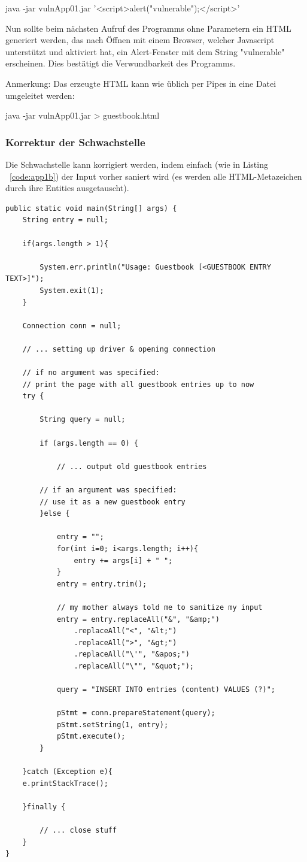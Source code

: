 \documentclass[12pt,a4paper,titlepage,oneside]{scrartcl}
\begin{document}
java -jar vulnApp01.jar '<script>alert("vulnerable");</script>'

Nun sollte beim nächsten Aufruf des Programms ohne Parametern ein HTML generiert werden, das nach Öffnen mit einem Browser, welcher Javascript unterstützt und aktiviert hat, ein Alert-Fenster mit dem String "vulnerable" erscheinen.
Dies bestätigt die Verwundbarkeit des Programms.

Anmerkung: Das erzeugte HTML kann wie üblich per Pipes in eine Datei umgeleitet werden:

java -jar vulnApp01.jar > guestbook.html

\subsubsection{Korrektur der Schwachstelle}
Die Schwachstelle kann korrigiert werden, indem einfach (wie in Listing ~\ref*{code:app1b}) der Input vorher saniert wird (es werden alle HTML-Metazeichen durch ihre Entities ausgetauscht).
\begin{lstlisting}[caption=XSS Schwachstelle,label=code:app1b,style=c]
public static void main(String[] args) {
	String entry = null;
	
	if(args.length > 1){
	
		System.err.println("Usage: Guestbook [<GUESTBOOK ENTRY TEXT>]");
		System.exit(1);
	}
	
	Connection conn = null;
	
	// ... setting up driver & opening connection
	
	// if no argument was specified:
	// print the page with all guestbook entries up to now
	try {
	
		String query = null;
		
		if (args.length == 0) {
		
			// ... output old guestbook entries
			
		// if an argument was specified:
		// use it as a new guestbook entry
		}else {
		
			entry = "";
			for(int i=0; i<args.length; i++){
				entry += args[i] + " ";
			}
			entry = entry.trim();
			
			// my mother always told me to sanitize my input
			entry = entry.replaceAll("&", "&amp;")
				.replaceAll("<", "&lt;")
				.replaceAll(">", "&gt;")
				.replaceAll("\'", "&apos;")
				.replaceAll("\"", "&quot;");
			
			query = "INSERT INTO entries (content) VALUES (?)";
			
			pStmt = conn.prepareStatement(query);
			pStmt.setString(1, entry);
			pStmt.execute();
		}
	
	}catch (Exception e){
	e.printStackTrace();
	
	}finally {
	
		// ... close stuff
	}
}

\end{lstlisting}
\end{document}

